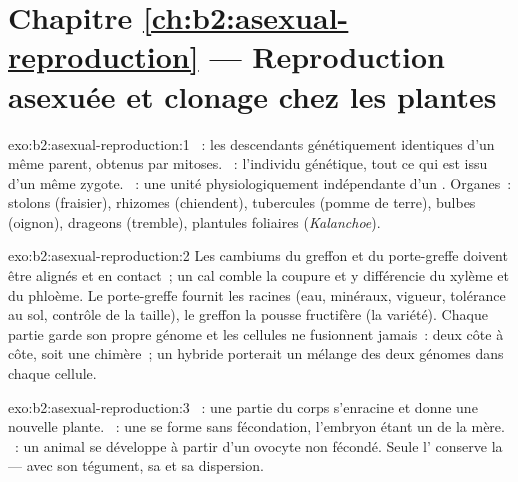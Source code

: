 \section*{Chapitre \ref{ch:b2:asexual-reproduction} --- Reproduction asexuée et clonage chez les plantes}

\begin{solution}{exo:b2:asexual-reproduction:1}
~: les descendants génétiquement identiques d'un même parent,
obtenus par mitoses. ~: l'individu génétique, tout ce qui est issu
d'un même zygote. ~: une unité physiologiquement indépendante d'un
. Organes~: stolons (fraisier), rhizomes (chiendent), tubercules
(pomme de terre), bulbes (oignon), drageons (tremble), plantules
foliaires (\emph{Kalanchoe}).
\end{solution}

\begin{solution}{exo:b2:asexual-reproduction:2}
Les cambiums du greffon et du porte-greffe doivent être alignés et en
contact~; un cal comble la coupure et y différencie du xylème et du
phloème. Le porte-greffe fournit les racines (eau, minéraux, vigueur,
tolérance au sol, contrôle de la taille), le greffon la pousse
fructifère (la variété). Chaque partie garde son propre génome et les
cellules ne fusionnent jamais~: deux  côte à côte, soit une
chimère~; un hybride porterait un mélange des deux génomes dans chaque
cellule.
\end{solution}

\begin{solution}{exo:b2:asexual-reproduction:3}
~: une partie du corps s'enracine et donne une
nouvelle plante. ~: une  se forme sans fécondation,
l'embryon étant un  de la mère. ~: un animal se
développe à partir d'un ovocyte non fécondé. Seule l' conserve la
 --- avec son tégument, sa  et sa dispersion.
\end{solution}

